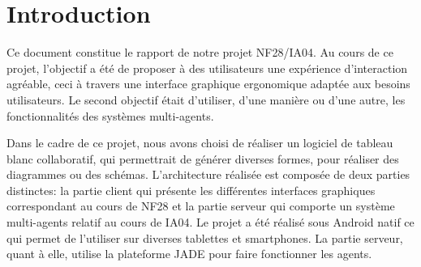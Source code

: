 \documentclass[a4paper,11pt]{article}
\begin{document}


\newpage
\section{Introduction}

Ce document constitue le rapport de notre projet NF28/IA04.
Au cours de ce projet, l'objectif a été de proposer à des utilisateurs une expérience d'interaction agréable, ceci à travers une interface graphique ergonomique adaptée aux besoins utilisateurs.
Le second objectif était d'utiliser, d'une manière ou d'une autre, les fonctionnalités des systèmes multi-agents.

Dans le cadre de ce projet, nous avons choisi de réaliser un logiciel de tableau blanc collaboratif, qui permettrait de générer diverses formes, pour réaliser des diagrammes ou des schémas.
L'architecture réalisée est composée de deux parties distinctes: la partie client qui présente les différentes interfaces graphiques correspondant au cours de NF28 et la partie serveur qui comporte un système multi-agents relatif au cours de IA04.
Le projet a été réalisé sous Android natif ce qui permet de l'utiliser sur diverses tablettes et smartphones.
La partie serveur, quant à elle, utilise la plateforme JADE pour faire fonctionner les agents.


%
%
\end{document}
